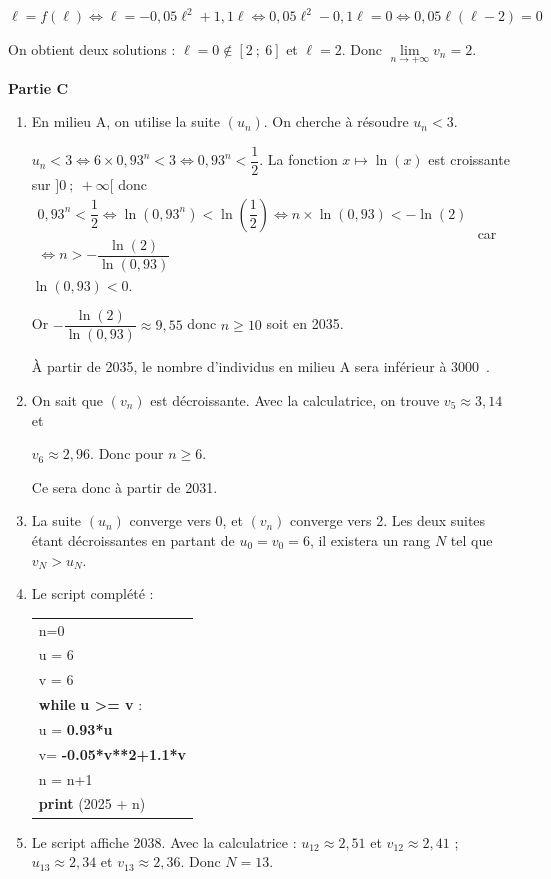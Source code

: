 \documentclass[10pt]{article}
\providecommand{\np}[2][]{{#2~#1}}
\providecommand{\ds}{\displaystyle}
\begin{document}
\begin{enumerate}[resume]
\begin{enumerate}
		$\ell=f(\ell) \iff \ell=-0,05\ell^2+1,1\ell \iff 0,05\ell^2-0,1 \ell=0 \iff 0,05\ell(\ell-2)=0$
		
		On obtient deux solutions : $\ell=0 \notin [2~;~6]$ et $\ell=2$. Donc $\ds \lim\limits_{n \to +\infty} v_n=2$.
	\end{enumerate}
\end{enumerate}

\bigskip

\textbf{Partie C}

\medskip

\begin{enumerate}
	\item En milieu A, on utilise la suite $(u_n)$. On cherche à résoudre $u_n<3$.
	
	$u_n<3 \iff 6\times 0,93^n<3 \iff 0,93^n <\dfrac{1}{2}$. La fonction $x\mapsto \ln(x)$ est croissante sur $]0~;~+\infty[$ donc $\begin{gathered}0,93^n <\dfrac{1}{2} \iff \ln\left(0,93^n\right)<\ln\left(\dfrac{1}{2} \right) \iff n \times \ln(0,93) <-\ln(2)\\ \iff n>-\dfrac{\ln(2)}{\ln(0,93)}\end{gathered}$ car $\ln(0,93) < 0$.
	
Or $-\dfrac{\ln(2)}{\ln(0,93)}\approx 9,55$ donc $n\geqslant 10$ soit en 2035.

À partir de 2035, le nombre d'individus en milieu A sera inférieur à \np{3000}.
	\item On sait que $(v_n)$ est décroissante. Avec la calculatrice, on trouve $v_5\approx 3,14$ et 
	
$v_6\approx 2,96$. Donc pour $n\geqslant 6$.
	
Ce sera donc à partir de 2031.
	\item La suite $(u_n)$ converge vers 0, et $(v_n)$ converge vers 2. Les deux suites étant décroissantes en partant de $u_0 = v_0=6$, il existera un rang $N$ tel que $v_N > u_N$.
	\item Le script complété :
	\begin{center}
		\begin{tabular}{|l|}\hline
			n=0 \\
			u = 6\\
			v = 6 \\
			\textbf{while} \textbf{u >= v} :\\
			\qquad u = \textbf{0.93*u}\\
			\qquad v= \textbf{-0.05*v**2+1.1*v}\\
			\qquad n = n+1\\
			\textbf{print} (2025 + n)\\ \hline
		\end{tabular}
	\end{center}
	\item Le script affiche 2038. Avec la calculatrice : $u_{12} \approx 2,51$ et $v_{12}\approx 2,41$ ; $u_{13} \approx 2,34$ et $v_{13}\approx 2,36$. Donc $N = 13$.
\end{enumerate}
\end{document}
